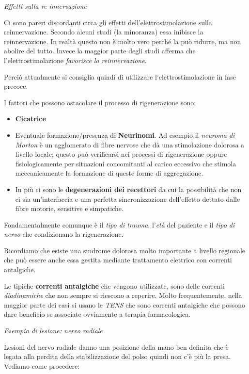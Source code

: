 \documentclass[]{article}
\begin{document}
\emph{Effetti sulla re innervazione}

Ci sono pareri discordanti circa gli effetti dell'elettrostimolazione
sulla reinnervazione. Secondo alcuni studi (la minoranza) essa inibisce
la reinnervazione. In realtà questo non è molto vero perché la può
ridurre, ma non abolire del tutto. Invece la maggior parte degli studi
afferma che l'elettrostimolazione \emph{favorisce la reinnervazione}.

Perciò attualmente si consiglia quindi di utilizzare
l'elettrostimolazione in fase precoce.

I fattori che possono ostacolare il processo di rigenerazione sono:

\begin{itemize}
\item
  \textbf{Cicatrice}
\item
  Eventuale formazione/presenza di \textbf{Neurinomi}. Ad esempio il
  \emph{neuroma di Morton} è un agglomerato di fibre nervose che dà una
  stimolazione dolorosa a livello locale; questo può verificarsi nei
  processi di rigenerazione oppure fisiologicamente per situazioni
  concomitanti al carico eccessivo che stimola meccanicamente la
  formazione di queste forme di aggregazione.
\item
  In più ci sono le \textbf{degenerazioni dei recettori} da cui la
  possibilità che non ci sia un'interfaccia e una perfetta
  sincronizzazione dell'effetto dettato dalle fibre motorie, sensitive e
  simpatiche.
\end{itemize}

Fondamentalmente comunque è il \emph{tipo di trauma}, l'\emph{età} del
paziente e il \emph{tipo di nervo} che condizionano la rigenerazione.

Ricordiamo che esiste una sindrome dolorosa molto importante a livello
regionale che può essere anche essa gestita mediante trattamento
elettrico con correnti antalgiche.

Le tipiche \textbf{correnti antalgiche} che vengono utilizzate, sono
delle correnti \emph{diadinamiche} che non sempre si riescono a
reperire. Molto frequentemente, nella maggior parte dei casi si usano le
\emph{TENS} che sono correnti antalgiche che possono dare beneficio se
associate ovviamente a terapia farmacologica.

\emph{Esempio di lesione: nervo radiale}

Lesioni del nervo radiale danno una posizione della mano ben definita
che è legata alla perdita della stabilizzazione del polso quindi non c'è
più la presa. Vediamo come procedere:
\end{document}
